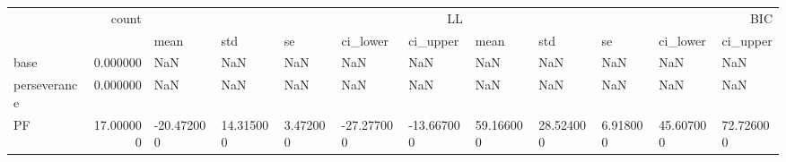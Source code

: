 \begin{tabular}{lrllllllllll}
\toprule
 & count & \multicolumn{5}{r}{LL} & \multicolumn{5}{r}{BIC} \\
 &  & mean & std & se & ci_lower & ci_upper & mean & std & se & ci_lower & ci_upper \\
\midrule
base & 0.000000 & NaN & NaN & NaN & NaN & NaN & NaN & NaN & NaN & NaN & NaN \\
perseverance & 0.000000 & NaN & NaN & NaN & NaN & NaN & NaN & NaN & NaN & NaN & NaN \\
PF & 17.000000 & -20.472000 & 14.315000 & 3.472000 & -27.277000 & -13.667000 & 59.166000 & 28.524000 & 6.918000 & 45.607000 & 72.726000 \\
\bottomrule
\end{tabular}
